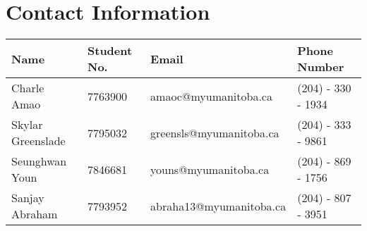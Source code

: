\documentclass{article}
\begin{document}
\section*{Contact Information}

\begin{table}[h]
\begin{tabular}{|l|l|l|l|}
\hline
\textbf{Name}     & \textbf{Student No.} & \textbf{Email}          & \textbf{Phone Number}  \\ \hline
Charle Amao       & 7763900              & amaoc@myumanitoba.ca    & (204) - 330 - 1934 \\ \hline
Skylar Greenslade & 7795032              & greensls@myumanitoba.ca & (204) - 333 - 9861 \\ \hline
Seunghwan Youn    & 7846681              & youns@myumanitoba.ca    & (204) - 869 - 1756 \\ \hline
Sanjay Abraham    & 7793952              & abraha13@myumanitoba.ca & (204) - 807 - 3951 \\ \hline
\end{tabular}
\end{table}
\end{document}
